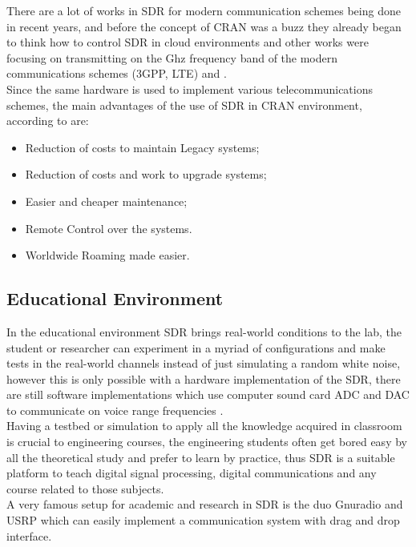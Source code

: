 There are a lot of works in SDR for modern communication schemes being done in
recent years, and before the concept of CRAN was a buzz they already began to
think how to control SDR in cloud environments \cite{dayananda2012} and other
works were focusing on transmitting on the Ghz frequency band of the modern
communications schemes (3GPP, LTE) \cite{kelley2009} and \cite{neenu2014}.\\

Since the same hardware is used to implement various telecommunications schemes,
the main advantages of the use of SDR in CRAN environment, according to
\cite{dayananda2012} are:

\begin{itemize}
    \item Reduction of costs to maintain Legacy systems;
    \item Reduction of costs and work to upgrade systems;
    \item Easier and cheaper maintenance;
    \item Remote Control over the systems.
    \item Worldwide Roaming made easier.
\end{itemize}


\subsection{Educational Environment}

In the educational environment SDR brings real-world conditions to the lab, the
student or researcher can experiment in a myriad of configurations and make
tests in the real-world channels instead of just simulating a random white
noise, however this is only possible with a hardware implementation of the SDR,
there are still software implementations which use computer sound card ADC and
DAC to communicate on voice range frequencies \cite{ladimer2009}.\\

Having a testbed or simulation to apply all the knowledge acquired in classroom
is crucial to engineering courses, the engineering students often get bored easy
by all the theoretical study and prefer to learn by practice, thus SDR is a
suitable platform to teach digital signal processing, digital communications and
any course related to those subjects.\\

A very famous setup for academic and research in SDR is the duo Gnuradio
\cite{web:gnuradio} and USRP \cite{web:usrp} which can easily implement a
communication system with drag and drop interface\cite{akbook}.\\



